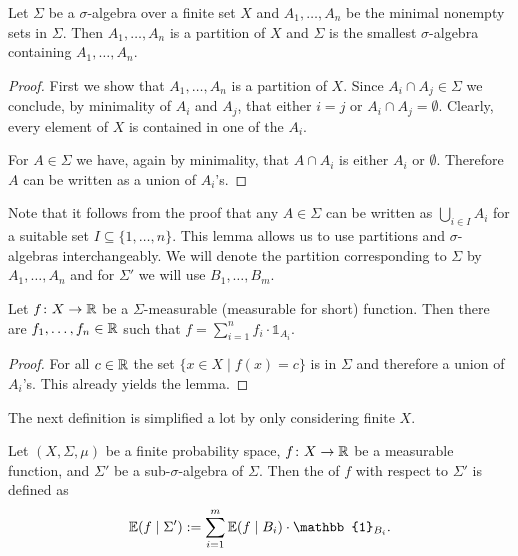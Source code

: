 \begin{lemma}
	Let $\Sigma$ be a $\sigma$-algebra over a finite set $X$ and $A_1,\dots,A_n$ be the minimal nonempty sets in $\Sigma$. Then $A_1,\dots,A_n$ is a partition of $X$ and $\Sigma$ is the smallest $\sigma$-algebra containing $A_1,\dots,A_n$.
\end{lemma}
\begin{proof}
	First we show that $A_1,\dots,A_n$ is a  partition of $X$. Since $A_i\cap A_j\in\Sigma$ we conclude, by minimality of $A_i$ and $A_j$, that either $i=j$ or $A_i\cap A_j=\emptyset$. Clearly, every element of $X$ is contained in one of the $A_i$. 
				
	For $A\in\Sigma$ we have, again by minimality, that $A\cap A_i$ is either $A_i$ or $\emptyset$. Therefore $A$ can be written as a union of $A_i$'s.
\end{proof}
Note that it follows from the proof that any $A\in\Sigma$ can be written as $\bigcup_{i\in I}A_i$ for a suitable set $I\subseteq\{1,\dots,n\}$. This lemma allows us to use partitions and $\sigma$-algebras interchangeably. We will denote the partition corresponding to $\Sigma$ by $A_1,\dots,A_n$ and for $\Sigma'$ we will use $B_1,\dots,B_{m}$.
\begin{lemma}\label{lem:measurabilityForm}
	Let $f\colon X\to\mathbb{R}$ be a $\Sigma$-measurable (measurable for short) function. Then there are $f_1,\dots,f_n\in\mathbb{R}$ such that $f=\sum_{i=1}^{n}f_i\cdot\mathbb{1}_{A_i}$.
\end{lemma}
\begin{proof}
	For all $c\in\mathbb{R}$ the set $\{x\in X\mid f(x)=c\}$ is in $\Sigma$ and therefore a union of $A_i$'s. This already yields the lemma.
\end{proof}
		
The next definition is simplified a lot by only considering finite $X$.
		
\begin{definition}
	Let $(X,\Sigma,\mu)$ be a finite probability space, $f\colon X\to \mathbb{R}$ be a measurable function, and $\Sigma'$ be a sub-$\sigma$-algebra of $\Sigma$. Then the  of $f$ with respect to $\Sigma'$ is defined as
	\[\E(f\mid \Sigma'):=\sum_{i=1}^{m}\E(f\mid B_i)\cdot \mathbb{1}_{B_i}.\]
\end{definition}
		
